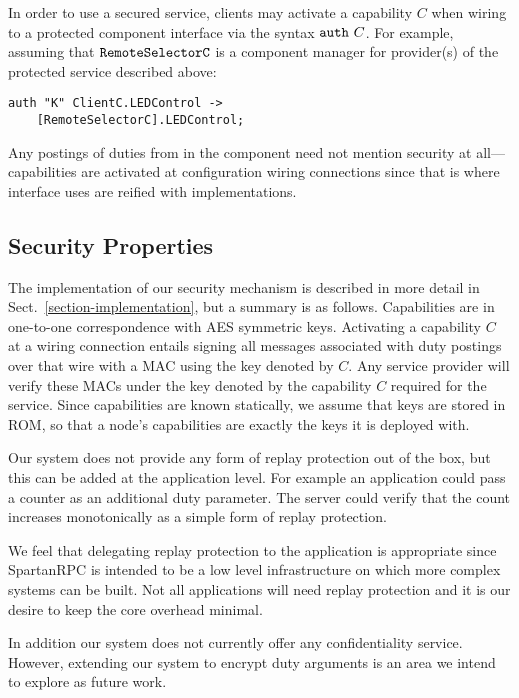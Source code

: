 In order to use a secured service, clients may activate a capability $C$ when wiring to a
protected component interface via the syntax $\code{auth}\ C$. For example, assuming that
$\code{RemoteSelectorC}$ is a component manager for provider(s) of the protected 
service described above:
\begin{Verbatim}
auth "K" ClientC.LEDControl ->
    [RemoteSelectorC].LEDControl;
\end{Verbatim}
\vspace{0.4em}
Any postings of duties from  in the  component need not mention
security at all---capabilities are activated at configuration wiring connections since that is
where interface uses are reified with implementations.

\subsection{Security Properties}

The implementation of our security mechanism is described in more detail in
Sect.~\ref{section-implementation}, but a summary is as follows. Capabilities are in one-to-one
correspondence with AES symmetric keys. Activating a capability $C$ at a wiring connection
entails signing all messages associated with duty postings over that wire with a MAC using the
key denoted by $C$. Any service provider will verify these MACs under the key denoted by the
capability $C$ required for the service. Since capabilities are known statically, we assume that
keys are stored in ROM, so that a node's capabilities are exactly the keys it is deployed with.

Our system does not provide any form of replay protection out of the box, but this can be added
at the application level. For example an application could pass a counter as an additional duty
parameter. The server could verify that the count increases monotonically as a simple form of
replay protection.

We feel that delegating replay protection to the application is appropriate since SpartanRPC is
intended to be a low level infrastructure on which more complex systems can be built. Not all
applications will need replay protection and it is our desire to keep the core overhead minimal.

In addition our system does not currently offer any confidentiality service. However, extending
our system to encrypt duty arguments is an area we intend to explore as future work.
